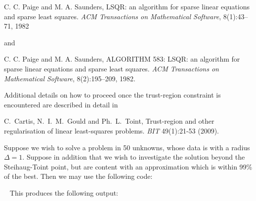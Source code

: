\documentclass{galahad}
\begin{document}
\noindent
C. C. Paige and M. A. Saunders,
LSQR: an algorithm for sparse linear equations and sparse least  squares.
{\em ACM Transactions on Mathematical Software}, 8(1):43--71, 1982

\noindent
and

\noindent
C. C. Paige and M. A. Saunders,
ALGORITHM 583: LSQR: an algorithm for sparse linear equations and
  sparse least squares.
{\em ACM Transactions on Mathematical Software}, 8(2):195--209, 1982.

\noindent
Additional details on how to proceed once the trust-region constraint is
encountered are described in detail in
\vspace*{1mm}

\noindent
C.\ Cartis, N.\ I.\ M.\ Gould and Ph.\ L.\ Toint,
Trust-region and other regularisation of linear
least-squares problems.
{\em BIT} 49(1):21-53 (2009).


\galexample
Suppose we wish to solve a problem in 50 unknowns, whose data is
with a radius $\Delta = 1$. Suppose in addition that we wish to investigate
the solution beyond the Steihaug-Toint point, but are content with
an approximation which is within 99\% of the best.
Then we may use the following code:

{\tt \small
\VerbatimInput{\packageexample}
}
\noindent
This produces the following output:
{\tt \small
\VerbatimInput{\packageresults}
}
\end{document}
